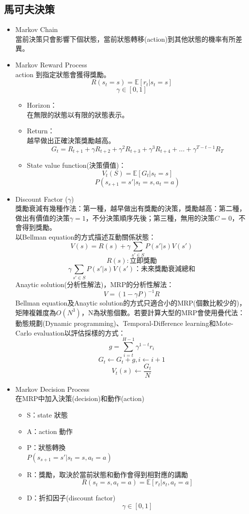 \documentclass[14pt,a4paper]{report}  %
\begin{document}
\subsection{馬可夫決策}
\begin{itemize}
\item Markov Chain\\
當前決策只會影響下個狀態，當前狀態轉移(action)到其他狀態的機率有所差異。
\item Markov Reward Process\\
action 到指定狀態會獲得獎勵。
$$R(s_t=s) = \mathbb{E}[r_t|s_t = s]$$
$$\gamma \in [0, 1]$$
\begin{itemize}
\item Horizon：\\
在無限的狀態以有限的狀態表示。\\
\item Return：\\
越早做出正確決策獎勵越高。\\
$$G_t = R_{t+1}+\gamma R_{t+2}+\gamma^2 R_{t+3}+\gamma^3 R_{t+4}+...+\gamma^{T-t-1} R_{T}$$
\item State value function(決策價值)：\\
$$V_t(S) = \mathbb{E}[G_t|s_t = s]$$
$$P(s_{s+1}=s'|s_t=s,a_t=a)$$
\end{itemize}
\item Discount Factor ($\gamma$)\\
獎勵衰減有幾種作法：第一種，越早做出有獎勵的決策，獎勵越高：第二種，做出有價值的決策$\gamma = 1$，不分決策順序先後；第三種，無用的決策$C = 0$，不會得到獎勵。\\
以Bellman equation的方式描述互動關係狀態：\\
$$V(s) = R(s)+\gamma\sum_{s'\in S}P(s'|s)V(s')$$
$$R(s):立即獎勵$$
$$\gamma\sum_{s'\in S}P(s'|s)V(s')：未來獎勵衰減總和$$
Anaytic solution(分析性解法)，MRP的分析性解法：\\
$$V = (1-\gamma P)^{-1}R$$
Bellman equation及Anaytic solution的方式只適合小的MRP(個數比較少的)，矩陣複雜度為$O(N^3)$，N為狀態個數。若要計算大型的MRP會使用疊代法：動態規劃(Dynamic programming)、Temporal-Difference learning和Mote-Carlo evaluation以評估採樣的方式：
$$g = \sum_{i=t}^{H-1}\gamma^{1-t}r_i$$
$$G_t \leftarrow G_t+g,  i \leftarrow i+1$$
$$V_t(s) \leftarrow \frac{G_t}{N}$$
\item Markov Decision Process\\
\quad 在MRP中加入決策(decision)和動作(action)
\begin{itemize}
\item S：state 狀態
\item A：action 動作
\item P：狀態轉換\\[6pt]
$P(s_{s+1}=s'|s_t=s,a_t=a)$
\item R：獎勵，取決於當前狀態和動作會得到相對應的講勵
$$R(s_t=s, a_t=a) = \mathbb{E}[r_t|s_t, a_t=a]$$
\item D：折扣因子(discount factor)
$$\gamma \in [0,1]$$
\end{itemize}
\end{itemize}
\end{document}
